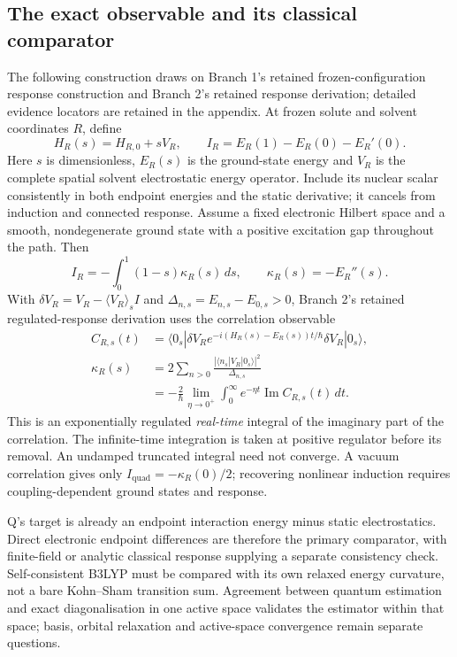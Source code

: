 \documentclass{article}
\begin{document}
\subsection{The exact observable and its classical comparator}

The following construction draws on Branch 1's retained frozen-configuration response construction and Branch 2's retained response derivation; detailed evidence locators are retained in the appendix. At frozen solute and solvent coordinates $R$, define
\begin{equation*}
H_R(s)=H_{R,0}+sV_R,\qquad I_R=E_R(1)-E_R(0)-E_R'(0).
\end{equation*}
Here $s$ is dimensionless, $E_R(s)$ is the ground-state energy and $V_R$ is the complete spatial solvent electrostatic energy operator. Include its nuclear scalar consistently in both endpoint energies and the static derivative; it cancels from induction and connected response. Assume a fixed electronic Hilbert space and a smooth, nondegenerate ground state with a positive excitation gap throughout the path. Then
\begin{equation*}
I_R=-\int_0^1(1-s)\kappa_R(s)\,ds,\qquad \kappa_R(s)=-E_R''(s).
\end{equation*}
With $\delta V_R=V_R-\langle V_R\rangle_s I$ and $\Delta_{n,s}=E_{n,s}-E_{0,s}>0$, Branch 2's retained regulated-response derivation uses the correlation observable
\begin{align*}
C_{R,s}(t)&=\langle0_s|\delta V_R e^{-i(H_R(s)-E_R(s))t/\hbar}\delta V_R|0_s\rangle,\\
\kappa_R(s)&=2\sum_{n>0}\frac{|\langle n_s|V_R|0_s\rangle|^2}{\Delta_{n,s}}\\
&=-\frac{2}{\hbar}\lim_{\eta\to0^+}\int_0^\infty e^{-\eta t}\operatorname{Im}C_{R,s}(t)\,dt.
\end{align*}
This is an exponentially regulated \emph{real-time} integral of the imaginary part of the correlation. The infinite-time integration is taken at positive regulator before its removal. An undamped truncated integral need not converge. A vacuum correlation gives only $I_{\mathrm{quad}}=-\kappa_R(0)/2$; recovering nonlinear induction requires coupling-dependent ground states and response.

Q's target is already an endpoint interaction energy minus static electrostatics. Direct electronic endpoint differences are therefore the primary comparator, with finite-field or analytic classical response supplying a separate consistency check. Self-consistent B3LYP must be compared with its own relaxed energy curvature, not a bare Kohn--Sham transition sum. Agreement between quantum estimation and exact diagonalisation in one active space validates the estimator within that space; basis, orbital relaxation and active-space convergence remain separate questions.
\end{document}
